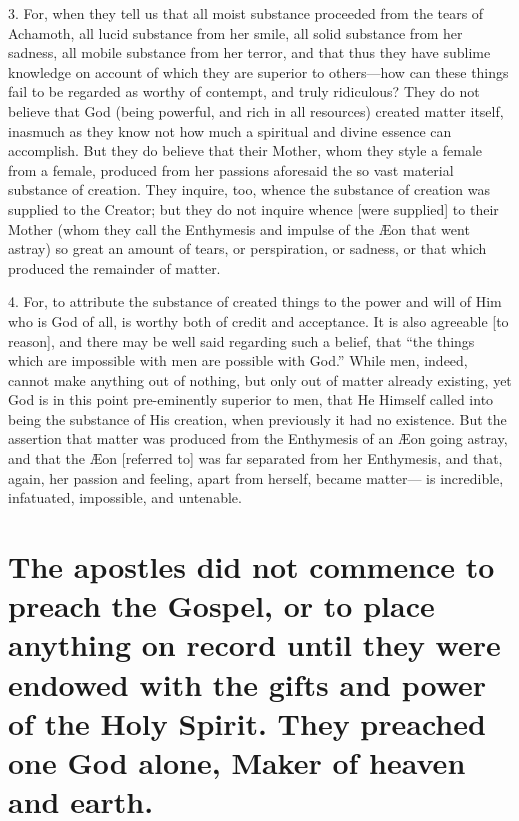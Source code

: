 \documentclass[9pt, twocolumn, oneside, a4paper]{memoir}
\newcommand{\gloss}[1]{%
    \marginpar[\RaggedLeft \footnotesize{#1}]{\RaggedRight \footnotesize{#1}}}
\begin{document}
3. For, when they tell us that all moist substance proceeded from the tears of Achamoth, all lucid substance from her smile, all solid substance from her sadness, all mobile substance from her terror, and that thus they have sublime knowledge on account of which they are superior to others—how can these things fail to be regarded as worthy of contempt, and truly ridiculous? They do not believe that God (being powerful, and rich in all resources) created matter itself, inasmuch as they know not how much a spiritual and divine essence can accomplish. But they do believe that their Mother, whom they style a female from a female, produced from her passions aforesaid the so vast material substance of creation. They inquire, too, whence the substance of creation was supplied to the Creator; but they do not inquire whence [were supplied] to their Mother (whom they call the Enthymesis and impulse of the Æon that went astray) so great an amount of tears, or perspiration, or sadness, or that which produced the remainder of matter.

4. For, to attribute the substance of created things to the power and will of Him who is God of all, is worthy both of credit and acceptance. It is also agreeable [to reason], and there may be well said regarding such a belief, that ``the things which are impossible with men are possible with God.'' \gloss{Luke 18:27} While men, indeed, cannot make anything out of nothing, but only out of matter already existing, yet God is in this point pre-eminently superior to men, that He Himself called into being the substance of His creation, when previously it had no existence. But the assertion that matter was produced from the Enthymesis of an Æon going astray, and that the Æon [referred to] was far separated from her Enthymesis, and that, again, her passion and feeling, apart from herself, became matter— is incredible, infatuated, impossible, and untenable.
\section*{The apostles did not commence to preach the Gospel, or to place anything on record until they were endowed with the gifts and power of the Holy Spirit. They preached one God alone, Maker of heaven and earth.}
\end{document}
